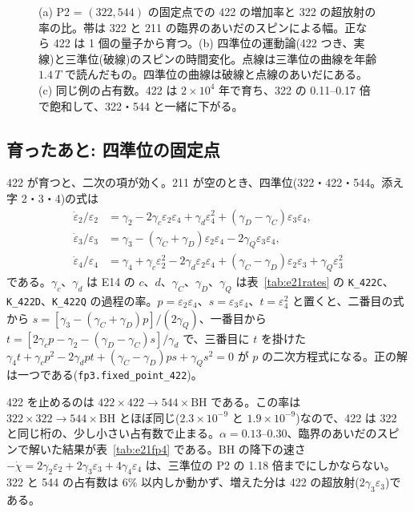\begin{figure}[H]
\centering

\caption{(a) P2 = $(322,544)$ の固定点での 422 の増加率と 322 の超放射の率の比。帯は 322 と 211 の臨界のあいだのスピンによる幅。正なら 422 は 1 個の量子から育つ。(b) 四準位の運動論(422 つき、実線)と三準位(破線)のスピンの時間変化。点線は三準位の曲線を年齢 $1.4\,T$ で読んだもの。四準位の曲線は破線と点線のあいだにある。(c) 同じ例の占有数。422 は $2\times10^4$ 年で育ち、322 の 0.11--0.17 倍で飽和して、322・544 と一緒に下がる。}
\label{fig:e21}
\end{figure}

\subsection{育ったあと: 四準位の固定点}

422 が育つと、二次の項が効く。211 が空のとき、四準位(322・422・544。添え字 2・3・4)の式は
\begin{align}
\dot\varepsilon_2/\varepsilon_2&=\gamma_2-2\gamma_c\varepsilon_2\varepsilon_4+\gamma_d\varepsilon_4^2+(\gamma_D-\gamma_C)\varepsilon_3\varepsilon_4,\nonumber\\
\dot\varepsilon_3/\varepsilon_3&=\gamma_3-(\gamma_C+\gamma_D)\varepsilon_2\varepsilon_4-2\gamma_Q\varepsilon_3\varepsilon_4,\label{eq:e21fp4}\\
\dot\varepsilon_4/\varepsilon_4&=\gamma_4+\gamma_c\varepsilon_2^2-2\gamma_d\varepsilon_2\varepsilon_4+(\gamma_C-\gamma_D)\varepsilon_2\varepsilon_3+\gamma_Q\varepsilon_3^2\nonumber
\end{align}
である。$\gamma_c$、$\gamma_d$ は E14 の $c$、$d$、$\gamma_C$、$\gamma_D$、$\gamma_Q$ は表~\ref{tab:e21rates} の \texttt{K\_422C}、\texttt{K\_422D}、\texttt{K\_422Q} の過程の率。$p=\varepsilon_2\varepsilon_4$、$s=\varepsilon_3\varepsilon_4$、$t=\varepsilon_4^2$ と置くと、二番目の式から $s=[\gamma_3-(\gamma_C+\gamma_D)p]/(2\gamma_Q)$、一番目から $t=[2\gamma_cp-\gamma_2-(\gamma_D-\gamma_C)s]/\gamma_d$ で、三番目に $t$ を掛けた $\gamma_4t+\gamma_cp^2-2\gamma_dpt+(\gamma_C-\gamma_D)ps+\gamma_Qs^2=0$ が $p$ の二次方程式になる。正の解は一つである(\texttt{fp3.fixed\_point\_422})。

422 を止めるのは $422\times422\to544\times\mathrm{BH}$ である。この率は $322\times322\to544\times\mathrm{BH}$ とほぼ同じ($2.3\times10^{-9}$ と $1.9\times10^{-9}$)なので、422 は 322 と同じ桁の、少し小さい占有数で止まる。$\alpha=0.13$--0.30、臨界のあいだのスピンで解いた結果が表~\ref{tab:e21fp4} である。BH の降下の速さ $-\dot\chi=2\gamma_2\varepsilon_2+2\gamma_3\varepsilon_3+4\gamma_4\varepsilon_4$ は、三準位の P2 の 1.18 倍までにしかならない。322 と 544 の占有数は 6\% 以内しか動かず、増えた分は 422 の超放射($2\gamma_3\varepsilon_3$)である。

